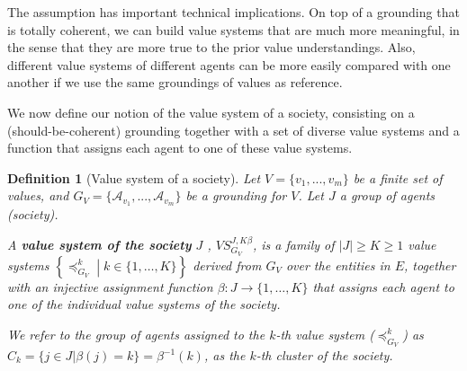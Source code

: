 \documentclass{ecai}
\newtheorem{definition}{Definition}
\newcommand{\A}{\mathcal{A}}
\newcommand{\abs}[1]{{\left|#1\right|}}
\begin{document}
The assumption has important technical implications. On top of a grounding that is totally coherent, we can build value systems that are much more meaningful, in the sense that they are more true to the prior value understandings. Also, different value systems of different agents can be more easily compared with one another if we use the same groundings of values as reference. 



We now define our notion of the value system of a society, consisting on a (should-be-coherent) grounding together with a set of diverse value systems and a function that assigns each agent to one of these value systems.

\begin{definition}[Value system of a society]\label{def:society-value-system}
Let $V = \{v_1, ..., v_m\}$ be a finite set of values, and $G_V=\{\A_{v_1},..., \A_{v_m}\}$ be a grounding for $V$. Let $J$ a group of agents (society). 

A \textbf{value system of the society} $J$ , $VS^{J,K\beta}_{G_V}$, is a family of $\abs{J} \geq K\geq 1$ value systems $\left\{\preccurlyeq^k_{G_V} \middle| k \in \{1, \dots, K\}\right\}$  derived from $G_V$  over the entities in $E$, together with an injective assignment function $\beta : J \to \{1,\dots, K\}$ that assigns each agent to one of the individual value systems of the society.

We refer to the group of agents assigned to the $k$-th value system ($\preccurlyeq^k_{G_V}$) as $C_k = \{j \in J | \beta(j) = k\} = \beta^{-1}(k)$, as the $k$-th \textit{cluster} of the society.
\end{definition}
\end{document}
